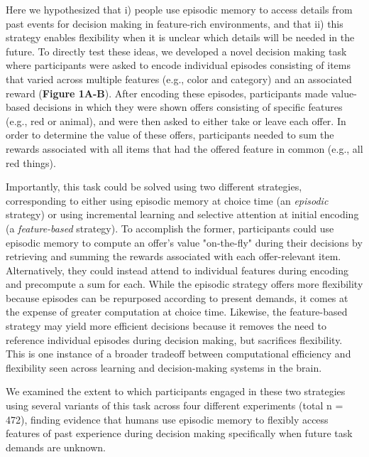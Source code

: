 \documentclass[10pt,letterpaper]{article}
\begin{document}
Here we hypothesized that i) people use episodic memory to access details from past events for decision making in feature-rich environments, and that ii) this strategy enables flexibility when it is unclear which details will be needed in the future. To directly test these ideas, we developed a novel decision making task where participants were asked to encode individual episodes consisting of items that varied across multiple features (e.g., color and category) and an associated reward (\textbf{Figure 1A-B}). After encoding these episodes, participants made value-based decisions in which they were shown offers consisting of specific features (e.g., red or animal), and were then asked to either take or leave each offer. In order to determine the value of these offers, participants needed to sum the rewards associated with all items that had the offered feature in common (e.g., all red things).

Importantly, this task could be solved using two different strategies, corresponding to either using episodic memory at choice time (an \textit{episodic} strategy) or using incremental learning and selective attention at initial encoding (a \textit{feature-based} strategy). To accomplish the former, participants could use episodic memory to compute an offer's value "on-the-fly" during their decisions by retrieving and summing the rewards associated with each offer-relevant item. Alternatively, they could instead attend to individual features during encoding and precompute a sum for each. While the episodic strategy offers more flexibility because episodes can be repurposed according to present demands, it comes at the expense of greater computation at choice time. Likewise, the feature-based strategy may yield more efficient decisions because it removes the need to reference individual episodes during decision making, but sacrifices flexibility. This is one instance of a broader tradeoff between computational efficiency and flexibility seen across learning and decision-making systems in the brain\cite{dawAlgorithmicAnatomyModelbased2014, koolWhenDoesModelBased2016, shohamyHabitsReinforcementLearning2014, gershmanReinforcementLearningEpisodic2017}.

We examined the extent to which participants engaged in these two strategies using several variants of this task across four different experiments (total n = 472), finding evidence that humans use episodic memory to flexibly access features of past experience during decision making specifically when future task demands are unknown.
\end{document}
